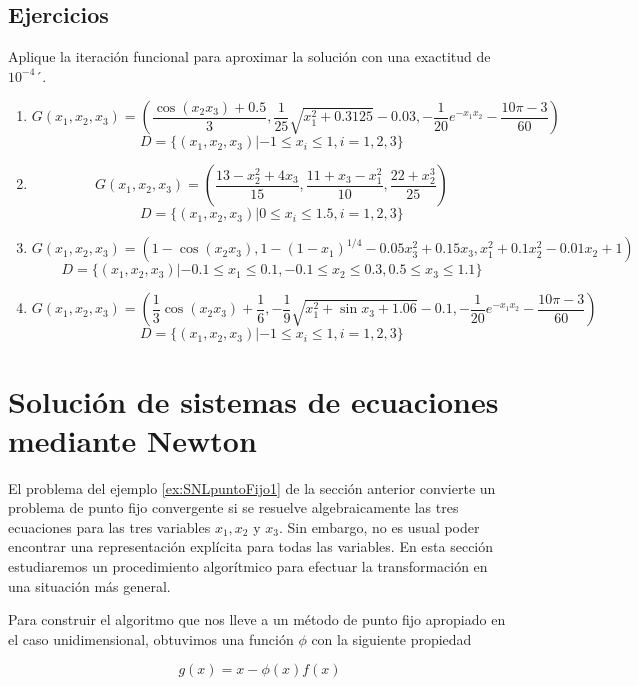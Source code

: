 \subsection*{Ejercicios}
Aplique la iteración funcional para aproximar la solución con una exactitud de $10^{-4}´$.
\begin{enumerate}
	\item 
		$$G(x_1,x_2,x_3) = \left(\frac{\cos (x_2x_3) + 0.5}{3}, \frac{1}{25}\sqrt{x_1^2+0.3125}-0.03, -\frac{1}{20}e^{-x_1x_2}-\frac{10\pi-3}{60} \right)$$
		$$D=\{ (x_1,x_2,x_3)| -1\leq x_i\leq 1, i=1,2,3 \}$$
		
	\item
		$$G(x_1,x_2,x_3) = \left( \frac{13-x_2^2+4x_3}{15}, \frac{11+x_3-x_1^2}{10}, \frac{22+x_2^3}{25} \right)$$
		$$D=\{ (x_1,x_2,x_3)| 0\leq x_i\leq 1.5, i=1,2,3 \}$$
			
	\item 
		$$G(x_1,x_2,x_3) = \left(1-\cos(x_2x_3), 1-(1-x_1)^{1/4}-0.05x_3^2+0.15x_3, x_1^2+0.1x_2^2-0.01x_2+1 \right)$$
		$$D=\{ (x_1,x_2,x_3)| -0.1\leq x_1\leq 0.1, -0.1\leq x_2\leq 0.3, 0.5\leq x_3\leq 1.1 \}$$
			
	\item
		$$G(x_1,x_2,x_3) = \left( \frac{1}{3}\cos(x_2x_3) + \frac{1}{6}, -\frac{1}{9}\sqrt{x_1^2+\sin x_3+1.06}-0.1, -\frac{1}{20}e^{-x_1x_2}
			-\frac{10\pi -3}{60} \right)$$
		$$D=\{ (x_1,x_2,x_3)| -1\leq x_i\leq 1, i=1,2,3 \}$$			
\end{enumerate}


\section{Solución de sistemas de ecuaciones mediante Newton}

El problema del ejemplo \ref{ex:SNLpuntoFijo1} de la sección anterior convierte un problema de punto fijo convergente si se resuelve 
algebraicamente las tres ecuaciones para las tres variables $x_1,x_2$ y $x_3$. Sin embargo, no es usual poder encontrar una representación 
explícita para todas las variables. En esta sección estudiaremos un procedimiento algorítmico para efectuar la transformación en una 
situación más general.

Para construir el algoritmo que nos lleve a un método de punto fijo apropiado en el caso unidimensional, obtuvimos una función $\phi$ con 
la siguiente propiedad

\begin{equation*}
	g(x) = x - \phi(x)f(x)
\end{equation*}

